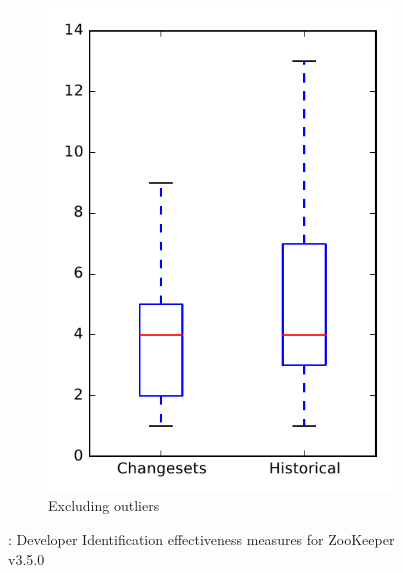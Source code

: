 \begin{figure}
\begin{subfigure}{.4\textwidth}
        \includegraphics[height=0.4\textheight]{figures/dit/rq2_zookeeper_no_outlier}
        \caption{Excluding outliers}\label{fig:dit:rq2:zookeeper_no_outlier}
    \end{subfigure}
\caption{\dtwo: Developer Identification effectiveness measures for ZooKeeper v3.5.0}
\label{fig:dit:rq2:zookeeper}
\end{figure}
